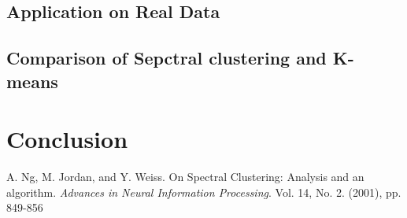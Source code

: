 \documentclass[11pt]{article}
\begin{document}
\subsection{Application on Real Data}
\subsection{Comparison of Sepctral clustering and K-means}



\section{Conclusion}

%
%


\newpage
\begin{thebibliography}{9}



A. Ng, M. Jordan, and Y. Weiss.
On Spectral Clustering: Analysis and an algorithm.
\textit{Advances in Neural Information Processing}.
Vol. 14, No. 2. (2001), pp. 849-856 

\end{thebibliography}
\end{document}
